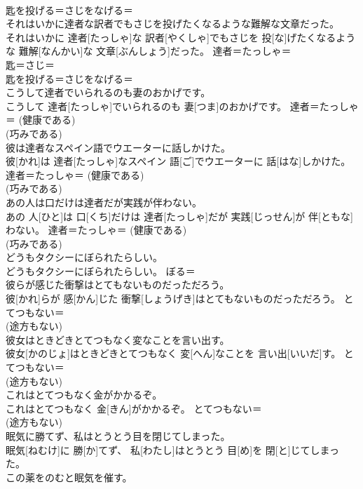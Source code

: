 \documentclass[8pt]{extreport}
\begin{document}
\begin{CJK}{UTF8}{min}
{\\	匙を投げる＝さじをなげる＝ 
\\	それはいかに達者な訳者でもさじを投げたくなるような難解な文章だった。	
\\	それはいかに 達者[たっしゃ]な 訳者[やくしゃ]でもさじを 投[な]げたくなるような 難解[なんかい]な 文章[ぶんしょう]だった。	達者＝たっしゃ＝ 
\\	匙＝さじ＝ 
\\	匙を投げる＝さじをなげる＝ 
\\	こうして達者でいられるのも妻のおかげです。	
\\	こうして 達者[たっしゃ]でいられるのも 妻[つま]のおかげです。	達者＝たっしゃ＝ (健康である) 
\\	(巧みである) 
\\	彼は達者なスペイン語でウエーターに話しかけた。	
\\	彼[かれ]は 達者[たっしゃ]なスペイン 語[ご]でウエーターに 話[はな]しかけた。	達者＝たっしゃ＝ (健康である) 
\\	(巧みである) 
\\	あの人は口だけは達者だが実践が伴わない。	
\\	あの 人[ひと]は 口[くち]だけは 達者[たっしゃ]だが 実践[じっせん]が 伴[ともな]わない。	達者＝たっしゃ＝ (健康である) 
\\	(巧みである) 
\\	どうもタクシーにぼられたらしい。	
\\	どうもタクシーにぼられたらしい。	ぼる＝ 
\\	彼らが感じた衝撃はとてもないものだっただろう。	
\\	彼[かれ]らが 感[かん]じた 衝撃[しょうげき]はとてもないものだっただろう。	とてつもない＝ 
\\	(途方もない)
\\	彼女はときどきとてつもなく変なことを言い出す。	
\\	彼女[かのじょ]はときどきとてつもなく 変[へん]なことを 言い出[いいだ]す。	とてつもない＝ 
\\	(途方もない)
\\	これはとてつもなく金がかかるぞ。	
\\	これはとてつもなく 金[きん]がかかるぞ。	とてつもない＝ 
\\	(途方もない)
\\	眠気に勝てず、私はとうとう目を閉じてしまった。	
\\	眠気[ねむけ]に 勝[か]てず、 私[わたし]はとうとう 目[め]を 閉[と]じてしまった。	
\\	この薬をのむと眠気を催す。	
}
\end{CJK}
\end{document}
